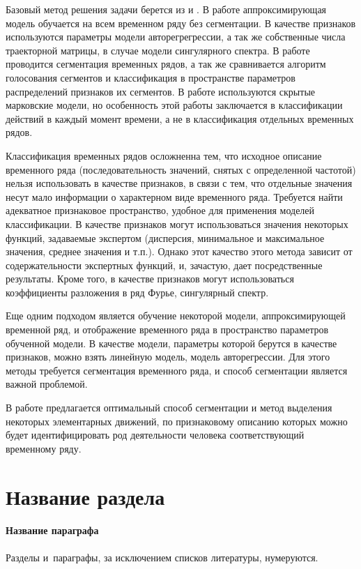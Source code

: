 \documentclass[12pt, twoside]{article}
\begin{document}
Базовый метод решения задачи берется из \cite{Ivkin15} и \cite{Karasikov16}. В работе \cite{Ivkin15} аппроксимирующая модель обучается на всем временном ряду без сегментации. В качестве признаков используются параметры модели авторегрегрессии, а так же собственные числа траекторной матрицы, в случае модели сингулярного спектра. В работе \cite{Karasikov16} проводится сегментация временных рядов, а так же сравнивается алгоритм голосования сегментов и классификация в пространстве параметров распределений признаков их сегментов. В работе \cite{Dafne19} используются скрытые марковские модели, но особенность этой работы заключается в классификации действий в каждый момент времени, а не в классификация отдельных временных рядов.

Классификация временных рядов осложненна тем, что исходное описание временного ряда (последовательность значений, снятых с определенной частотой) нельзя использовать в качестве признаков, в связи с тем, что отдельные значения несут мало информации о характерном виде временного ряда. Требуется найти адекватное признаковое пространство, удобное для применения моделей классификации. В качестве признаков могут использоваться значения некоторых функций, задаваемые экспертом (дисперсия, минимальное и максимальное значения, среднее значения и т.п.). Однако этот качество этого метода зависит от содержательности экспертных функций, и, зачастую, дает посредственные результаты. Кроме того, в качестве признаков могут использоваться коэффициенты разложения в ряд Фурье, сингулярный спектр.

Еще одним подходом является обучение некоторой модели, аппроксимирующей временной ряд, и отображение временного ряда в пространство параметров обученной модели. В качестве модели, параметры которой берутся в качестве признаков, можно взять линейную модель, модель авторегрессии. Для этого методы требуется сегментация временного ряда, и способ сегментации является важной проблемой.

В работе предлагается оптимальный способ сегментации и метод выделения некоторых элементарных движений, по признаковому описанию которых можно будет идентифицировать род деятельности человека соответствующий временному ряду.

\section{Название раздела}


\paragraph{Название параграфа}
Разделы и~параграфы, за исключением списков литературы, нумеруются.
\end{document}
